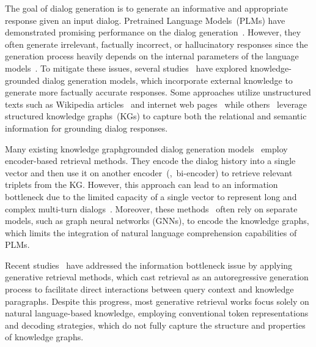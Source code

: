 
The goal of dialog generation is to generate an informative and appropriate response given an input dialog.
Pretrained Language Models~(PLMs) have demonstrated promising performance on the dialog generation~\cite{roberts2019exploring,touvron2023llama,achiam2023gpt}.
However, they often generate irrelevant, factually incorrect, or hallucinatory responses since the generation process heavily depends on the internal parameters of the language models~\cite{lewis2020retrieval,shuster2021retrieval}.
To mitigate these issues, several studies~\cite{wang2020improving,zhao2020low} have explored knowledge-grounded dialog generation models, which incorporate external knowledge to generate more factually accurate responses.
Some approaches utilize unstructured texts such as Wikipedia articles~\cite{dinan2019wizard} and internet web pages~\cite{ghazvininejad2018knowledge} while others~\cite{moon2019opendialkg,galetzka2021space,tuan2022towards,kang2022knowledge} leverage structured knowledge graphs~(KGs) to capture both the relational and semantic information for grounding dialog responses.

{
Many existing knowledge graph{\textendash}grounded dialog generation models~\cite{tuan2022towards,kang2022knowledge} employ encoder-based retrieval methods.
They encode the dialog history into a single vector and then use it on another encoder~(\eg,~bi-encoder) to retrieve relevant triplets from the KG.
However, this approach can lead to an information bottleneck due to the limited capacity of a single vector to represent long and complex multi-turn dialogs~\cite{humeau2020poly,de2021autoregressive,lee2022generative}.
Moreover, these methods~\cite{galetzka2021space,tuan2022towards,kang2022knowledge} often rely on separate models, such as graph neural networks (GNNs), to encode the knowledge graphs, which limits the integration of natural language comprehension capabilities of PLMs.
}

Recent studies~\cite{lee2022generative,sun2023generative} have addressed the information bottleneck issue by applying generative retrieval methods, which cast retrieval as an autoregressive generation process to facilitate direct interactions between query context and knowledge paragraphs.
Despite this progress, most generative retrieval works focus solely on natural language-based knowledge, employing conventional token representations and decoding strategies, which do not fully capture the structure and properties of knowledge graphs.

